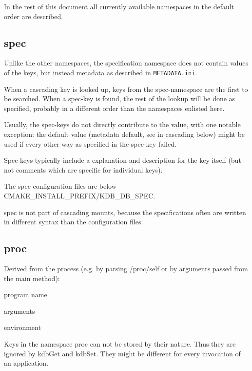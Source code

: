 In the rest of this document all currently available namespaces in the default order are described.

\subsection*{spec}

Unlike the other namespaces, the specification namespace does not contain values of the keys, but instead metadata as described in \href{/home/markus/Projekte/Elektra/current/doc/METADATA.ini}{\tt {\ttfamily M\+E\+T\+A\+D\+A\+T\+A.\+ini}}.

When a cascading key is looked up, keys from the spec-\/namespace are the first to be searched. When a spec-\/key is found, the rest of the lookup will be done as specified, probably in a different order than the namespaces enlisted here.

Usually, the spec-\/keys do not directly contribute to the value, with one notable exception\+: the default value (metadata {\ttfamily default}, see in cascading below) might be used if every other way as specified in the spec-\/key failed.

Spec-\/keys typically include a explanation and description for the key itself (but not comments which are specific for individual keys).

The spec configuration files are below {\ttfamily C\+M\+A\+K\+E\+\_\+\+I\+N\+S\+T\+A\+L\+L\+\_\+\+P\+R\+E\+F\+I\+X/\+K\+D\+B\+\_\+\+D\+B\+\_\+\+S\+P\+EC}.

spec is not part of cascading mounts, because the specifications often are written in different syntax than the configuration files.

\subsection*{proc}

Derived from the process (e.\+g. by parsing {\ttfamily /proc/self} or by arguments passed from the main method)\+:


\begin{DoxyItemize}
\item program name
\item arguments
\item environment
\end{DoxyItemize}

Keys in the namespace proc can not be stored by their nature. Thus they are ignored by {\ttfamily kdb\+Get} and {\ttfamily kdb\+Set}. They might be different for every invocation of an application.

